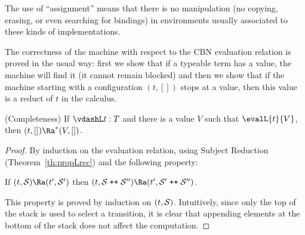 \documentclass{article}
\begin{document}
The use of ``assignment'' means that there is no manipulation (no
copying, erasing, or even searching for bindings) in environments
usually associated to these kinds of implementations.

The correctness of the machine with respect to the CBN evaluation
relation is proved in the usual way: first we show that if a typeable
term has a value, the machine will find it (it cannot remain blocked)
and then we show that if the machine starting with a configuration 
$(t,[])$ stops at a
value, then this value is a reduct of $t$ in the calculus.


\begin{theorem} (Completeness)
If $\vdashL t:T$ and there is a value $V$ such that 
$\evalL{t}{V}$, then $(t,[]) \Ra^* (V,[])$.
\end{theorem}

\begin{proof}
  By induction on the evaluation relation, using Subject Reduction
  (Theorem~\ref{th:propLrec}) and the following property:

If  $(t,{\cal S})\Ra (t',{\cal S}')$ then $(t,{\cal S}\;\texttt{++}\; {\cal S}'')\Ra 
(t',{\cal S}'\;\texttt{++}\;{\cal S}'')$.

This property is proved by induction on $(t,{\cal S})$. Intuitively,
since only the top of the stack is used to select a transition, it is
clear that appending elements at the bottom of the stack does not
affect the computation.
\end{proof}
\end{document}
